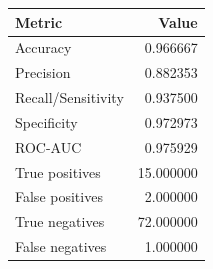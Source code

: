 \begin{tabular}{lr}
\toprule
Metric & Value \\
\midrule
Accuracy & 0.966667 \\
Precision & 0.882353 \\
Recall/Sensitivity & 0.937500 \\
Specificity & 0.972973 \\
ROC-AUC & 0.975929 \\
True positives & 15.000000 \\
False positives & 2.000000 \\
True negatives & 72.000000 \\
False negatives & 1.000000 \\
\bottomrule
\end{tabular}
